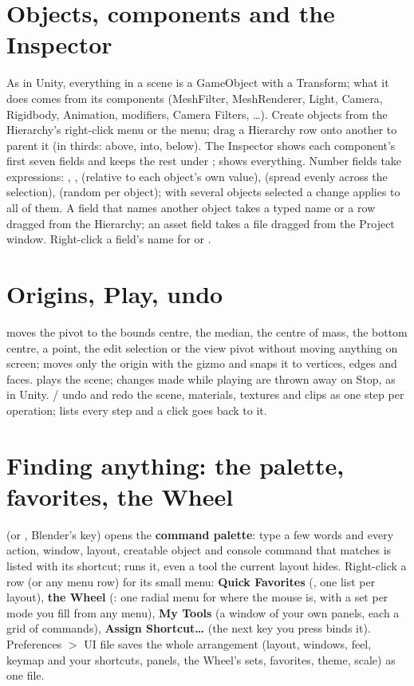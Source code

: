 \section{Objects, components and the Inspector}
As in Unity, everything in a scene is a GameObject with a Transform; what it does comes from its components
(MeshFilter, MeshRenderer, Light, Camera, Rigidbody, Animation, modifiers, Camera Filters, \ldots). Create objects from
the Hierarchy's right-click menu or the  menu; drag a Hierarchy row onto another to parent it (in
thirds: above, into, below). The Inspector shows each component's first seven fields and keeps the rest under
;  shows everything. Number fields take expressions: , , 
(relative to each object's own value),  (spread evenly across the selection),  (random per
object); with several objects selected a change applies to all of them. A field that names another object takes a typed
name or a row dragged from the Hierarchy; an asset field takes a file dragged from the Project window. Right-click a
field's name for  or .

\section{Origins, Play, undo}
 moves the pivot to the bounds centre, the median, the centre of mass, the bottom centre,
a point, the edit selection or the view pivot without moving anything on screen;  moves only
the origin with the gizmo and snaps it to vertices, edges and faces.  plays the scene; changes made while
playing are thrown away on Stop, as in Unity.  /  undo and redo the scene, materials, textures
and clips as one step per operation;  lists every step and a click goes back to it.

\section{Finding anything: the palette, favorites, the Wheel}
 (or , Blender's key) opens the \textbf{command palette}: type a few words and every action, window,
layout, creatable object and console command that matches is listed with its shortcut;  runs it, even a tool
the current layout hides. Right-click a row (or any menu row) for its small menu: \textbf{Quick Favorites} (,
one list per layout), \textbf{the Wheel} (: one radial menu for where the mouse is, with a set per mode you
fill from any menu), \textbf{My Tools} (a window of your own panels, each a grid of commands), \textbf{Assign
Shortcut\ldots} (the next key you press binds it). Preferences $>$ UI file saves the whole arrangement (layout, windows,
feel, keymap and your shortcuts, panels, the Wheel's sets, favorites, theme, scale) as one  file.

